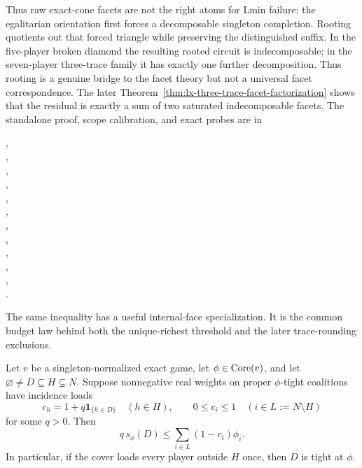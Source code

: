 Thus raw exact-cone facets are not the right atoms for Lmin failure: the
egalitarian orientation first forces a decomposable singleton completion.
Rooting quotients out that forced triangle while preserving the distinguished
suffix.  In the five-player broken diamond the resulting rooted circuit is
indecomposable; in the seven-player three-trace family it has exactly one
further decomposition.  Thus rooting is a genuine bridge to the facet theory
but not a universal facet correspondence.  The later
Theorem~\ref{thm:lx-three-trace-facet-factorization} shows that the residual
is exactly a sum of two saturated indecomposable facets.  The standalone proof, scope
calibration, and exact probes are in
\begin{center}
\small{},\\[-2pt]
\small{},\\[-2pt]
\small{},\\[-2pt]
\small{},\\[-2pt]
\small{},\\[-2pt]
\small{},\\[-2pt]
\small{},\\[-2pt]
\small{},\\[-2pt]
\small{},\\[-2pt]
\small{},\\[-2pt]
\small{},\\[-2pt]
\small{}.
\end{center}

The same inequality has a useful internal-face specialization.  It is the
common budget law behind both the unique-richest threshold and the later
trace-rounding exclusions.

\begin{corollary}
\label{cor:lx-exact-face-overload}
Let $v$ be a singleton-normalized exact game, let $\phi\in\operatorname{Core}(v)$, and let
$\varnothing\ne D\subseteq H\subsetneq N$.  Suppose nonnegative real weights
on proper $\phi$-tight coalitions have incidence loads
\[
 c_h=1+q\mathbf1_{\{h\in D\}}\quad(h\in H),
 \qquad 0\leq c_i\leq1\quad(i\in L:=N\setminus H)       \tag{OF}
 \label{eq:lx-exact-face-overload}
\]
for some $q>0$.  Then
\[
 q\,s_\phi(D)
 \leq\sum_{i\in L}(1-c_i)\phi_i.                       \tag{OB}
 \label{eq:lx-exact-face-overload-budget}
\]
In particular, if the cover loads every player outside $H$ once, then $D$
is tight at $\phi$.
\end{corollary}

